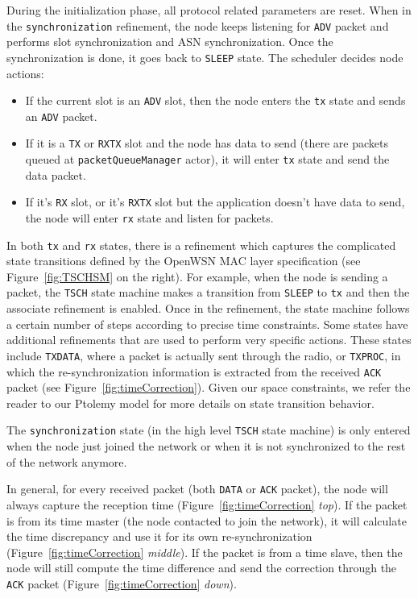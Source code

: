 During the initialization phase, all protocol related parameters are reset. When in the \texttt{synchronization} refinement, the node keeps listening for \texttt{ADV} packet and performs slot synchronization and ASN synchronization. Once the synchronization is done, it goes back to \texttt{SLEEP} state.
The scheduler decides node actions: 
\begin{itemize}
\item If the current slot is an \texttt{ADV} slot, then the node enters the \texttt{tx} state and sends an \texttt{ADV} packet. 
\item If it is a \texttt{TX} or \texttt{RXTX} slot and the node has data to send (there are packets queued at \texttt{packetQueueManager} actor), it will enter \texttt{tx} state and send the data packet. 
\item If it's \texttt{RX} slot, or it's \texttt{RXTX} slot but the application doesn't have data to send, the node will enter \texttt{rx} state and listen for packets.
\end{itemize}

In both \texttt{tx} and \texttt{rx} states, there is a refinement which captures the complicated state transitions defined by the OpenWSN MAC layer specification (see Figure~\ref{fig:TSCHSM} on the right). For example, when the node is sending a packet, the \texttt{TSCH} state machine makes a transition from \texttt{SLEEP} to \texttt{tx} and then the associate refinement is enabled. Once in the refinement, the state machine follows a certain number of steps according to precise time constraints. Some states have additional refinements that are used to perform very specific actions. These states include \texttt{TXDATA}, where a packet is actually sent through the radio, or \texttt{TXPROC}, in which the re-synchronization information is extracted from the received \texttt{ACK} packet (see Figure~\ref{fig:timeCorrection}). Given our space constraints, we refer the reader to our Ptolemy model for more details on state transition behavior.

The \texttt{synchronization} state (in the high level \texttt{TSCH} state machine) is only entered when the node just joined the network or when it is not synchronized to the rest of the network anymore. 

In general, for every received packet (both \texttt{DATA} or \texttt{ACK} packet), the node will always capture the reception time (Figure~\ref{fig:timeCorrection} {\em top}). If the packet is from its time master (the node contacted to join the network), it will calculate the time discrepancy and use it for its own re-synchronization (Figure~\ref{fig:timeCorrection} {\em middle}). If the packet is from a time slave, then the node will still compute the time difference and send the correction through the \texttt{ACK} packet (Figure~\ref{fig:timeCorrection} {\em down}).

